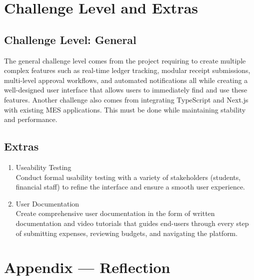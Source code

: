 \documentclass{article}
\begin{document}
\section{Challenge Level and Extras}
\subsection{Challenge Level: General}

\hspace{0.5cm}The general challenge level comes from the project requiring to create multiple complex features such as 
real-time ledger tracking, modular receipt submissions, multi-level approval workflows, and automated 
notifications all while creating a well-designed user interface that allows users to immediately find 
and use these features. Another challenge also comes from integrating TypeScript and Next.js with existing 
MES applications. This must be done while maintaining stability and performance. 

\subsection{Extras}

\begin{enumerate}
    \item Useability Testing \\
    Conduct formal usability testing with a variety of stakeholders (students, financial staff) to refine the interface and ensure a smooth user experience.
    \item User Documentation \\
    Create comprehensive user documentation in the form of written documentation and video tutorials that guides end-users through every step of submitting expenses, reviewing budgets, and navigating the platform.
\end{enumerate}

\newpage{}

\section*{Appendix --- Reflection}
\end{document}

